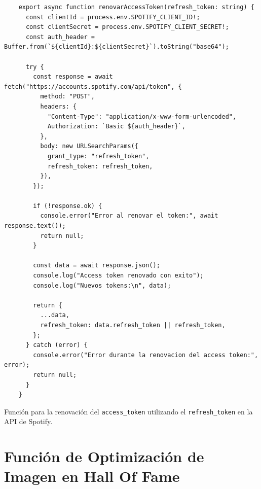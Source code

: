 \begin{ifalgorithm}[H]
    \begin{lstlisting}
    export async function renovarAccessToken(refresh_token: string) {
      const clientId = process.env.SPOTIFY_CLIENT_ID!;
      const clientSecret = process.env.SPOTIFY_CLIENT_SECRET!;
      const auth_header = Buffer.from(`${clientId}:${clientSecret}`).toString("base64");

      try {
        const response = await fetch("https://accounts.spotify.com/api/token", {
          method: "POST",
          headers: {
            "Content-Type": "application/x-www-form-urlencoded",
            Authorization: `Basic ${auth_header}`,
          },
          body: new URLSearchParams({
            grant_type: "refresh_token",
            refresh_token: refresh_token,
          }),
        });

        if (!response.ok) {
          console.error("Error al renovar el token:", await response.text());
          return null;
        }

        const data = await response.json();
        console.log("Access token renovado con exito");
        console.log("Nuevos tokens:\n", data);

        return {
          ...data,
          refresh_token: data.refresh_token || refresh_token,
        };
      } catch (error) {
        console.error("Error durante la renovacion del access token:", error);
        return null;
      }
    }
    \end{lstlisting}
    \caption{Función para la renovación del \texttt{access\_token} utilizando el \texttt{refresh\_token} en la API de Spotify.}
    \label{alg:renovar_access_token}
\end{ifalgorithm}

\section*{Función de Optimización de Imagen en Hall Of Fame}

